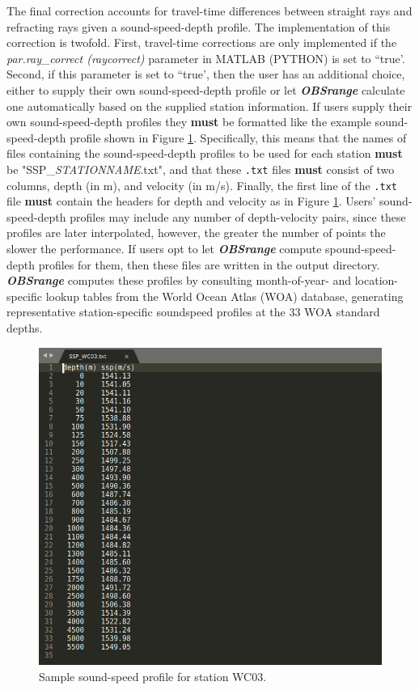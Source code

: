 \documentclass[titlepage, 12pt]{article}
\begin{document}
   The final correction accounts for travel-time differences between straight rays and refracting rays given a sound-speed-depth profile. The implementation of this correction is twofold. First, travel-time corrections are only implemented if the \textit{par.ray\_correct (raycorrect)} parameter in MATLAB (PYTHON) is set to ``true'. Second, if this parameter is set to ``true', then the user has an additional choice, either to supply their own sound-speed-depth profile or let \textbf{\textit{OBSrange}} calculate one automatically based on the supplied station information. If users supply their own sound-speed-depth profiles they \textbf{must} be formatted like the example sound-speed-depth profile shown in Figure \ref{fig:ssp}. Specifically, this means that the names of files containing the sound-speed-depth profiles to be used for each station \textbf{must} be "SSP\_\textit{STATIONNAME}.txt", and that these \texttt{.txt} files \textbf{must} consist of two columns, depth (in m), and velocity (in m/s). Finally, the first line of the \texttt{.txt} file \textbf{must} contain the headers for depth and velocity as in Figure \ref{fig:ssp}. Users' sound-speed-depth profiles may include any number of depth-velocity pairs, since these profiles are later interpolated, however, the greater the number of points the slower the performance. If users opt to let \textbf{\textit{OBSrange}} compute spound-speed-depth profiles for them, then these files are written in the output directory. \textbf{\textit{OBSrange}} computes these profiles by consulting month-of-year- and location-specific lookup tables from the World Ocean Atlas (WOA) database, generating representative station-specific soundspeed profiles at the 33 WOA standard depths. 

   \begin{figure}[!htb]
    \includegraphics[width=\linewidth]{ssp.png}
    \caption{Sample sound-speed profile for station WC03.}
    \label{fig:ssp}
   \end{figure}
\end{document}
